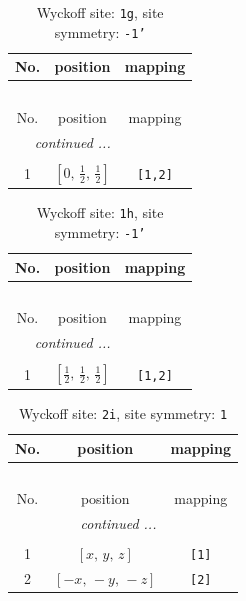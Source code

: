 \documentclass[fleqn,8pt]{jsarticle}
\begin{document}
\renewcommand{\arraystretch}{1.2}
\begin{longtable}{ccc}
\caption{Wyckoff site: {\tt 1g}, site symmetry: {\tt -1'}}
 \\
 \hline \hline
No. & position & mapping \\ \hline \endfirsthead

\multicolumn{2}{l}{\tablename\ \thetable{}} \\
 \hline \hline
No. & position & mapping \\ \hline \endhead

 \hline \hline
\multicolumn{2}{r}{\footnotesize\it continued ...} \\ \endfoot

 \hline \hline
\multicolumn{2}{r}{} \\ \endlastfoot

1 & $\left[ 0,\, \frac{1}{2},\, \frac{1}{2} \right]$ & {\tt [1,2]} \\
\end{longtable}
\renewcommand{\arraystretch}{1.2}
\begin{longtable}{ccc}
\caption{Wyckoff site: {\tt 1h}, site symmetry: {\tt -1'}}
 \\
 \hline \hline
No. & position & mapping \\ \hline \endfirsthead

\multicolumn{2}{l}{\tablename\ \thetable{}} \\
 \hline \hline
No. & position & mapping \\ \hline \endhead

 \hline \hline
\multicolumn{2}{r}{\footnotesize\it continued ...} \\ \endfoot

 \hline \hline
\multicolumn{2}{r}{} \\ \endlastfoot

1 & $\left[ \frac{1}{2},\, \frac{1}{2},\, \frac{1}{2} \right]$ & {\tt [1,2]} \\
\end{longtable}
\renewcommand{\arraystretch}{1.2}
\begin{longtable}{ccc}
\caption{Wyckoff site: {\tt 2i}, site symmetry: {\tt 1}}
 \\
 \hline \hline
No. & position & mapping \\ \hline \endfirsthead

\multicolumn{2}{l}{\tablename\ \thetable{}} \\
 \hline \hline
No. & position & mapping \\ \hline \endhead

 \hline \hline
\multicolumn{2}{r}{\footnotesize\it continued ...} \\ \endfoot

 \hline \hline
\multicolumn{2}{r}{} \\ \endlastfoot

1 & $\left[ x,\, y,\, z \right]$ & {\tt [1]} \\ \hline
2 & $\left[ - x,\, - y,\, - z \right]$ & {\tt [2]} \\
\end{longtable}
\end{document}
